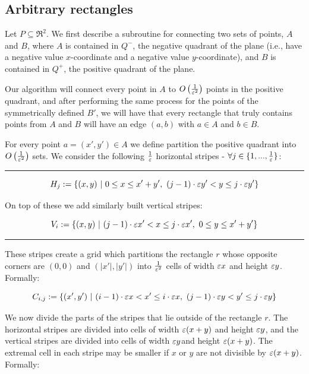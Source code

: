 \documentclass[12pt]{article}%
\begin{document}
    \subsection{Arbitrary rectangles}

    Let $P\subseteq \Re^2$. We first describe a subroutine for
    connecting two sets of points, $A$ and $B$, where $A$ is contained
    in $Q^-$, the negative quadrant of the plane (i.e., have a
    negative value $x$-coordinate and a negative value
    $y$-coordinate), and $B$ is contained in $Q^+$, the positive
    quadrant of the plane.

    Our algorithm will connect every point in $A$ to
    $O\left(\frac{1}{\varepsilon^2}\right)$ points in the positive quadrant,
    and after performing the same process for the points of the
    symmetrically defined $B'$, we will have that every rectangle that
    truly contains points from $A$ and $B$ will have an edge $(a,b)$
    with $a\in A$ and $b\in B$.

    For every point $a = (x',y') \in A$ we define partition the
    positive quadrant into $O\left(\frac{1}{\varepsilon^2}\right)$ sets. We
    consider the following $\frac{1}{\varepsilon}$ horizontal stripes -
    $\forall j\in \{1,...,\frac{1}{\varepsilon}\}$:

    \hrule

\begin{equation}
    H_{j}:=\{(x,y)~|~  0 \leq x \leq x'+y'  ,~ (j-1)\cdot \varepsilon y' < y
    \leq j\cdot \varepsilon y'\}
\end{equation}

On top of these we add similarly built vertical stripes:

\begin{equation}
    V_{i}:=\{(x,y)~|~ (j-1)\cdot \varepsilon x' < x \leq j\cdot \varepsilon x',~ 0
    \leq y \leq x'+y' \}
\end{equation}

\hrule

These stripes create a grid which partitions the rectangle $r$ whose
opposite corners are $(0,0)$ and $(|x'|,|y'|)$ into $\frac{1}{\varepsilon^2}$
cells of width $\varepsilon x$ and height $\varepsilon y$. Formally:

\begin{equation}
    C_{i,j}:=\{(x',y')~|~  (i-1)\cdot \varepsilon x < x' \leq i\cdot \varepsilon x,~
    (j-1)\cdot \varepsilon y< y' \leq j\cdot \varepsilon y\}
\end{equation}

We now divide the parts of the stripes that lie outside of the
rectangle $r$. The horizontal stripes are divided into cells of width
$\varepsilon(x+y)$ and height $\varepsilon y$, and the vertical stripes are divided
into cells of width $\varepsilon y$and height $\varepsilon(x+y)$. The extremal cell
in each stripe may be smaller if $x$ or $y$ are not divisible by
$\varepsilon(x+y)$. Formally:
\end{document}
